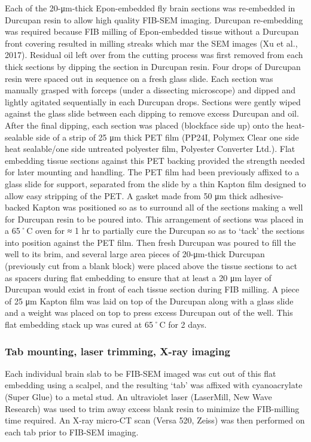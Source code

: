 \documentclass{article}
\begin{document}
Each of the 20-μm-thick Epon-embedded fly brain sections was re-embedded in Durcupan resin to allow high quality FIB-SEM imaging. Durcupan re-embedding was required because FIB milling of Epon-embedded tissue without a Durcupan front covering resulted in milling streaks which mar the SEM images (Xu et al., 2017). Residual oil left over from the cutting process was first removed from each thick sections by dipping the section in Durcupan resin. Four drops of Durcupan resin were spaced out in sequence on a fresh glass slide. Each section was manually grasped with forceps (under a dissecting microscope) and dipped and lightly agitated sequentially in each Durcupan drops. Sections were gently wiped against the glass slide between each dipping to remove excess Durcupan and oil. After the final dipping, each section was placed (blockface side up) onto the heat-sealable side of a strip of 25 μm thick PET film (PP24I, Polymex Clear one side heat sealable/one side untreated polyester film, Polyester Converter Ltd.). Flat embedding tissue sections against this PET backing provided the strength needed for later mounting and handling. The PET film had been previously affixed to a glass slide for support, separated from the slide by a thin Kapton film designed to allow easy stripping of the PET. A gasket made from 50 μm thick adhesive-backed Kapton was positioned so as to surround all of the sections making a well for Durcupan resin to be poured into. This arrangement of sections was placed in a 65˚C oven for ≈ 1 hr to partially cure the Durcupan so as to ‘tack’ the sections into position against the PET film. Then fresh Durcupan was poured to fill the well to its brim, and several large area pieces of 20-μm-thick Durcupan (previously cut from a blank block) were placed above the tissue sections to act as spacers during flat embedding to ensure that at least a 20 μm layer of Durcupan would exist in front of each tissue section during FIB milling. A piece of 25 μm Kapton film was laid on top of the Durcupan along with a glass slide and a weight was placed on top to press excess Durcupan out of the well. This flat embedding stack up was cured at 65˚C for 2 days.

\subsubsection*{Tab mounting, laser trimming, X-ray imaging}

Each individual brain slab to be FIB-SEM imaged was cut out of this flat embedding using a scalpel, and the resulting ‘tab’ was affixed with cyanoacrylate (Super Glue) to a metal stud. An ultraviolet laser (LaserMill, New Wave Research) was used to trim away excess blank resin to minimize the FIB-milling time required. An X-ray micro-CT scan (Versa 520, Zeiss) was then performed on each tab prior to FIB-SEM imaging.
\end{document}
